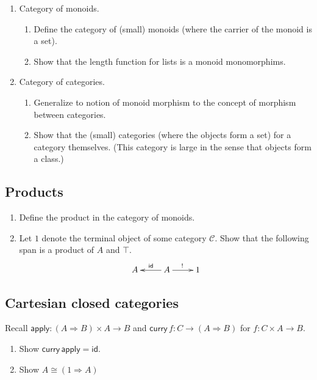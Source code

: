 \documentclass[a4paper]{scrartcl}
\newcommand{\tid}{\mathsf{id}}
\newcommand{\To}{\Rightarrow}
\newcommand{\too}{\longrightarrow}
\newcommand{\tcurry}{\mathsf{curry}}
\newcommand{\tapply}{\mathsf{apply}}
\begin{document}
\begin{enumerate}

\item Category of monoids.
  \begin{enumerate}
  \item Define the category of (small) monoids (where the carrier of
    the monoid is a set).
  \item Show that the length function for lists is a monoid monomorphims.
  \end{enumerate}

\item Category of categories.
  \begin{enumerate}
  \item Generalize to notion of monoid morphism to the concept of
    morphism between categories.
  \item Show that the (small) categories (where the objects form a
    set) for a category themselves.  (This category is large in the
    sense that objects form a class.)
  \end{enumerate}

\end{enumerate}

\subsection{Products}

\newcommand{\C}{\mathcal{C}}

\begin{enumerate}
\item Define the product in the category of monoids.
\item Let $1$ denote the terminal object of some category $\C$.
  Show that the following span is a product of $A$ and $\top$.
\[
\xymatrix{
  A & A \ar[l]_{\tid} \ar[r]^{!} & 1
}
\]
\end{enumerate}

\subsection{Cartesian closed categories}

Recall $\tapply : (A \To B) \times A \too B$ and
$\tcurry\, f : C \too (A \To B)$ for $f : C \times A \too B$.
\begin{enumerate}
\item Show $\tcurry\,\tapply = \tid$.
\item Show $A \cong (1 \To A)$
\end{enumerate}
\end{document}
